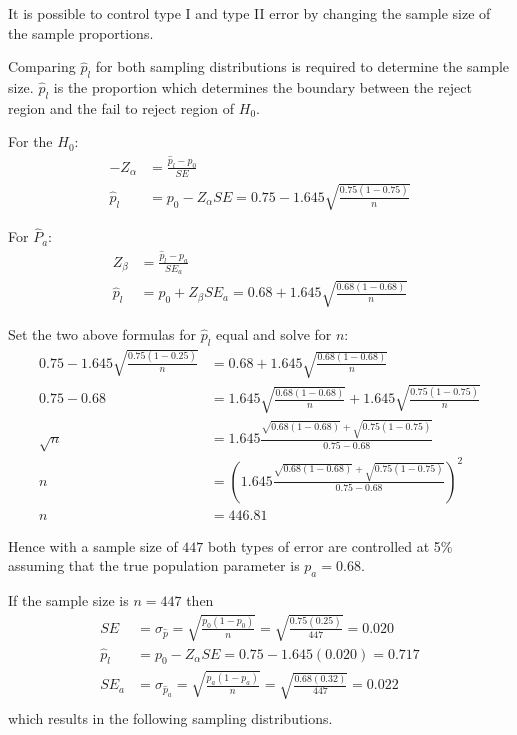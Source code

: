 \documentclass{article}
\begin{document}
It is possible to control type I and type II error by changing 
the sample size of the sample proportions.  

Comparing $\hat{p}_l$ for both sampling distributions is required to determine the sample size. $\hat{p}_l$ is the proportion which 
determines the boundary between the reject region and the fail to reject region of $H_0$.

For the $H_0$:
\begin{align*}
-Z_\alpha & = \frac{\hat{p}_l - p_0}{SE}\\
\hat{p}_l & = p_0 - Z_\alpha SE = 0.75 - 1.645\sqrt{\frac{0.75(1-0.75)}{n}}
\end{align*}

For $\hat{P}_a$:
\begin{align*}
Z_\beta & = \frac{\hat{p}_l - p_a}{SE_a}\\
\hat{p}_l & = p_0 + Z_\beta SE_a = 0.68 + 1.645\sqrt{\frac{0.68(1-0.68)}{n}}
\end{align*}


Set the two above formulas for $\hat{p}_l$ equal and solve for $n$:
\begin{align*}
0.75 - 1.645\sqrt{\frac{0.75(1-0.25)}{n}} & = 0.68 + 1.645\sqrt{\frac{0.68(1-0.68)}{n}}\\
0.75 - 0.68 & = 1.645\sqrt{\frac{0.68(1-0.68)}{n}}  + 1.645\sqrt{\frac{0.75(1-0.75)}{n}}\\
\sqrt{n} & = 1.645\frac{\sqrt{0.68(1-0.68)}+\sqrt{0.75(1-0.75)}}{0.75-0.68}\\
n &= \left(1.645\frac{\sqrt{0.68(1-0.68)}+\sqrt{0.75(1-0.75)}}{0.75-0.68}\right)^2\\
n &= 446.81
\end{align*}

Hence with a sample size of $447$ both types of error are controlled at 5\% assuming that the
true population parameter is $p_a=0.68$.

If the sample size is $n=447$ then
\begin{align*}
SE&=\sigma_{\hat{p}}=\sqrt{\frac{p_0(1-p_0)}{n}}=\sqrt{\frac{0.75(0.25)}{447}}=0.020\\
\hat{p}_l & = p_0 - Z_\alpha SE = 0.75- 1.645(0.020)=0.717\\
SE_a&=\sigma_{\hat{p}_a}=\sqrt{\frac{p_a(1-p_a)}{n}}=\sqrt{\frac{0.68(0.32)}{447}}=0.022\\
\end{align*}
which results in the following sampling distributions.
\end{document}
